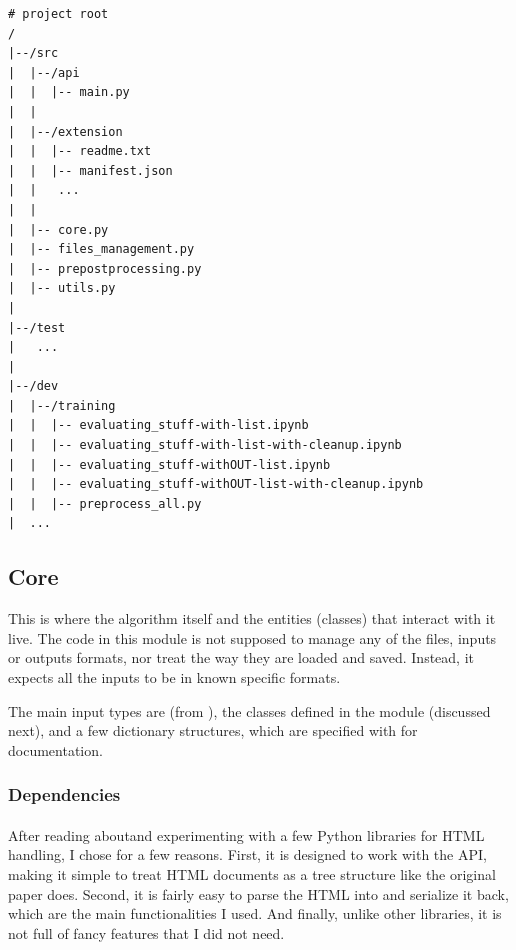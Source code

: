 \documentclass[10pt]{article}
\begin{document}
\begin{minipage}{\linewidth}
\begin{lstlisting}[caption=Main code structure.]
# project root
/  
|--/src
|  |--/api
|  |  |-- main.py
|  |  
|  |--/extension
|  |  |-- readme.txt
|  |  |-- manifest.json
|  |   ...
|  |
|  |-- core.py
|  |-- files_management.py
|  |-- prepostprocessing.py 
|  |-- utils.py
|
|--/test 
|   ...
|
|--/dev
|  |--/training
|  |  |-- evaluating_stuff-with-list.ipynb
|  |  |-- evaluating_stuff-with-list-with-cleanup.ipynb
|  |  |-- evaluating_stuff-withOUT-list.ipynb
|  |  |-- evaluating_stuff-withOUT-list-with-cleanup.ipynb
|  |  |-- preprocess_all.py
|  ...
\end{lstlisting}
\end{minipage}


\subsection{Core}

This is where the algorithm itself and the entities (classes) that interact with it live. The code in this module is not supposed to manage any of the files, inputs or outputs formats, nor treat the way they are loaded and saved. Instead, it expects all the inputs to be in known specific formats.

The main input types are  (from ), the classes defined in the module (discussed next), and a few dictionary structures, which are specified with \footnotemark for documentation\footnotemark.





\subsubsection{Dependencies}

\paragraph{} 

After reading about\footnotemark and experimenting with a few Python libraries for HTML handling, I chose  for a few reasons. First, it is designed to work with the  API, making it simple to treat HTML documents as a tree structure like the original paper does. Second, it is fairly easy to parse the HTML into  and serialize it back, which are the main functionalities I used. And finally, unlike other libraries, it is not full of fancy features that I did not need.
\end{document}
